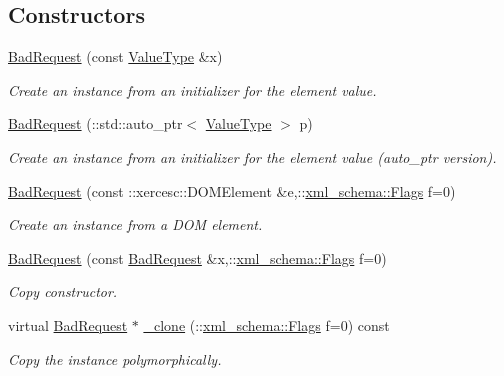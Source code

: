 \subsection*{Constructors}
\begin{DoxyCompactItemize}
\item 
\hyperlink{classopenstack_1_1xml_1_1BadRequest_adf3ce1fd95f54ffa68132459f6c2ce8f}{BadRequest} (const \hyperlink{classopenstack_1_1xml_1_1BadRequestAPIFault}{ValueType} \&x)
\begin{DoxyCompactList}\small\item\em Create an instance from an initializer for the element value. \item\end{DoxyCompactList}\item 
\hyperlink{classopenstack_1_1xml_1_1BadRequest_aa44b8c158d0671d2845eb582cc4a291d}{BadRequest} (::std::auto\_\-ptr$<$ \hyperlink{classopenstack_1_1xml_1_1BadRequestAPIFault}{ValueType} $>$ p)
\begin{DoxyCompactList}\small\item\em Create an instance from an initializer for the element value (auto\_\-ptr version). \item\end{DoxyCompactList}\item 
\hyperlink{classopenstack_1_1xml_1_1BadRequest_a50210f07997a0c873b1bfb896ade8956}{BadRequest} (const ::xercesc::DOMElement \&e,::\hyperlink{namespacexml__schema_affb4c227cbd9aa7453dd1dc5a1401943}{xml\_\-schema::Flags} f=0)
\begin{DoxyCompactList}\small\item\em Create an instance from a DOM element. \item\end{DoxyCompactList}\item 
\hyperlink{classopenstack_1_1xml_1_1BadRequest_ad31eacb13d8f83e42e8b2a2ef2caa84d}{BadRequest} (const \hyperlink{classopenstack_1_1xml_1_1BadRequest}{BadRequest} \&x,::\hyperlink{namespacexml__schema_affb4c227cbd9aa7453dd1dc5a1401943}{xml\_\-schema::Flags} f=0)
\begin{DoxyCompactList}\small\item\em Copy constructor. \item\end{DoxyCompactList}\item 
virtual \hyperlink{classopenstack_1_1xml_1_1BadRequest}{BadRequest} $\ast$ \hyperlink{classopenstack_1_1xml_1_1BadRequest_a86cd5bb3f3701308b6d45a4a6a210a24}{\_\-clone} (::\hyperlink{namespacexml__schema_affb4c227cbd9aa7453dd1dc5a1401943}{xml\_\-schema::Flags} f=0) const 
\begin{DoxyCompactList}\small\item\em Copy the instance polymorphically. \item\end{DoxyCompactList}\end{DoxyCompactItemize}
